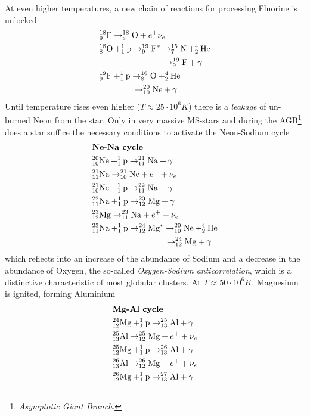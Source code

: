 \par At even higher temperatures, a new chain of reactions for processing Fluorine is unlocked
\begin{align*}
    & \element{F}{18}{9}\to \element{O}{18}{8}+e^{+}\nu_{e}\\
    & \element{O}{18}{8}+\element{p}{1}{1}\to \element{F}{19}{9}^{*}\to \element{N}{15}{7}+\element{He}{4}{2}\\
    &\quad\quad\quad\quad\quad\quad\quad\;\;\to \element{F}{19}{9}+\gamma\\
    & \element{F}{19}{9}+\element{p}{1}{1}\to \element{O}{16}{8}+\element{He}{4}{2}\\
    &\quad\quad\quad\;\,\;\;\to \element{Ne}{20}{10}+\gamma\\
\end{align*}
Until temperature rises even higher ($T\approx 25\cdot 10^{6}\unit{K}$) there is a \emph{leakage} of un-burned Neon from the star. Only in very massive MS-stars and during the AGB\footnote{\emph{Asymptotic Giant Branch}.} does a star suffice the necessary conditions to activate the Neon-Sodium cycle
\begin{align*}
    & \text{\textbf{Ne-Na cycle}}\\
    & \element{Ne}{20}{10}+\element{p}{1}{1}\to \element{Na}{21}{11}+\gamma\\
    & \element{Na}{21}{11}\to \element{Ne}{21}{10}+e^{+}+\nu_{e}\\
    & \element{Ne}{21}{10}+\element{p}{1}{1}\to \element{Na}{22}{11}+\gamma\\
    & \element{Na}{22}{11}+\element{p}{1}{1}\to \element{Mg}{23}{12}+\gamma\\
    & \element{Mg}{23}{12}\to \element{Na}{23}{11}+e^{+}+\nu_{e}\\
    & \element{Na}{23}{11}+\element{p}{1}{1}\to \element{Mg}{24}{12}^{*} \to \element{Ne}{20}{10}+\element{He}{4}{2}\\
    &\quad\quad\quad\quad\quad\quad\quad\quad\,\;\;\to \element{Mg}{24}{12}+\gamma
\end{align*}
which reflects into an increase of the abundance of Sodium and a decrease in the abundance of Oxygen, the so-called \emph{Oxygen-Sodium anticorrelation}, which is a distinctive characteristic of most globular clusters. At $T\approx 50\cdot 10^{6}\unit{K}$, Magnesium is ignited, forming Aluminium
\begin{align*}
    & \text{\textbf{Mg-Al cycle}}\\
    & \element{Mg}{24}{12}+\element{p}{1}{1}\to \element{Al}{25}{13}+\gamma\\
    & \element{Al}{25}{13}\to \element{Mg}{25}{12}+e^{+}+\nu_{e}\\
    & \element{Mg}{25}{12}+\element{p}{1}{1}\to \element{Al}{26}{13}+\gamma\\
    & \element{Al}{26}{13}\to \element{Mg}{26}{12}+e^{+}+\nu_{e}\\
    & \element{Mg}{26}{12}+\element{p}{1}{1}\to \element{Al}{27}{13}+\gamma
\end{align*}
